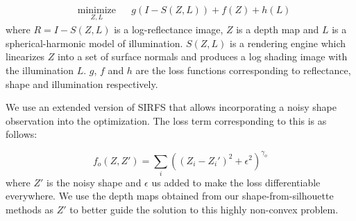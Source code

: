 \begin{equation*}
\begin{aligned}
& \underset{Z,L}{\text{minimize}}
& & g(I-S(Z,L))+f(Z)+h(L)
\end{aligned}
\end{equation*}
where $R=I-S(Z,L)$ is a log-reflectance image, $Z$ is a depth map and $L$ is a spherical-harmonic model of illumination. $S(Z,L)$ is a rendering engine which linearizes $Z$ into a set of surface normals and produces a log shading image with the illumination $L$. $g$, $f$ and $h$ are the loss functions corresponding to reflectance, shape and illumination respectively. 

We use an extended version of SIRFS that allows incorporating a noisy shape observation into the optimization. The loss term corresponding to this is as follows:

\begin{equation*}
f_o(Z,Z') = \underset{i}{\sum}((Z_i-Z_i')^2+\epsilon^2)^{\gamma_o}
\end{equation*}
where $Z'$ is the noisy shape and $\epsilon$ us added to make the loss differentiable everywhere. We use the depth maps obtained from our shape-from-silhouette methods as $Z'$ to better guide the solution to this highly non-convex problem. 

